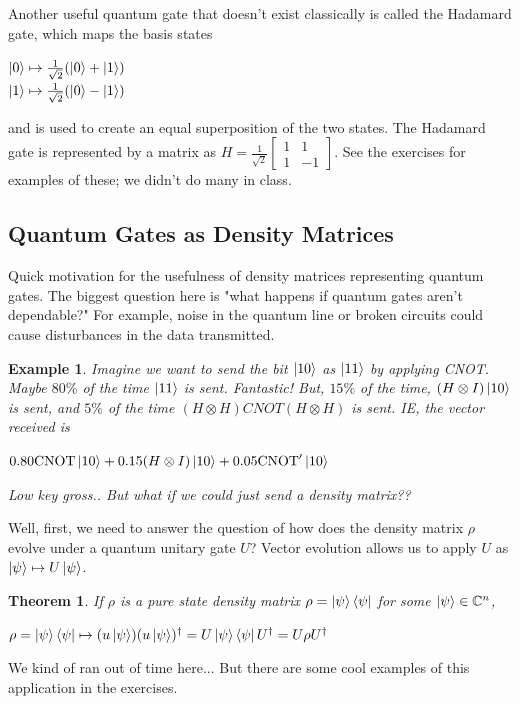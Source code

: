 \documentclass[12pt]{article}
\theoremstyle{plain}
\newtheorem{theorem}[lemma]{Theorem}
\theoremstyle{nonumberplain}
\theoremstyle{plain}
\newtheorem{example}[lemma]{Example}
\theoremstyle{nonumberplain}
\newcommand\1{{\bf 1}}
\newcommand{\bmat}[1]{\begin{bmatrix*} #1 \end{bmatrix*}} %
\newcommand{\C}{\mathbb{C}} %
\newcommand{\<}{\left\langle}
\renewcommand{\>}{\right\rangle}
\begin{document}
Another useful quantum gate that doesn't exist classically is called the Hadamard gate, which maps the basis states
\begin{center}
$\ket{0}\mapsto\frac{1}{\sqrt{2}}(\ket{0}+\ket{1})$\\
$\ket{1}\mapsto\frac{1}{\sqrt{2}}(\ket{0}-\ket{1})$
\end{center}
and is used to create an equal superposition of the two states. The Hadamard gate is represented by a matrix as $H=\frac{1}{\sqrt{2}}\bmat{1 & 1 \\ 1 & -1}$. See the exercises for examples of these; we didn't do many in class.


\subsection{Quantum Gates as Density Matrices}
Quick motivation for the usefulness of density matrices representing quantum gates. The biggest question here is "what happens if quantum gates aren't dependable?" For example, noise in the quantum line or broken circuits could cause disturbances in the data transmitted.
\begin{example}
Imagine we want to send the bit $\ket{10}$ as $\ket{11}$ by applying CNOT. Maybe $80\%$ of the time $\ket{11}$ is sent. Fantastic! But, $15\%$ of the time, $(H\otimes I)\ket{10}$ is sent, and $5\%$ of the time $(H\otimes H)CNOT(H\otimes H)$ is sent. IE, the vector received is
\begin{center}
$0.80\text{CNOT}\ket{10}+0.15(H\otimes I)\ket{10}+0.05\text{CNOT}'\ket{10}$
\end{center}
Low key gross.. But what if we could just send a density matrix??
\end{example}
Well, first, we need to answer the question of how does the density matrix $\rho$ evolve under a quantum unitary gate $U$? Vector evolution allows us to apply $U$ as $\ket{\psi}\mapsto U\ket{\psi}$.
\begin{theorem}
If $\rho$ is a pure state density matrix $\rho=\ket{\psi}\bra{\psi}$ for some $\ket{\psi}\in\C^n$,
\begin{center}
$\rho=\ket{\psi}\bra{\psi}\mapsto (u\ket{\psi})(u\ket{\psi})^\dagger=U\ket{\psi}\bra{\psi}U^\dagger=U\rho U^\dagger$
\end{center}
\end{theorem}
We kind of ran out of time here... But there are some cool examples of this application in the exercises.
\end{document}
